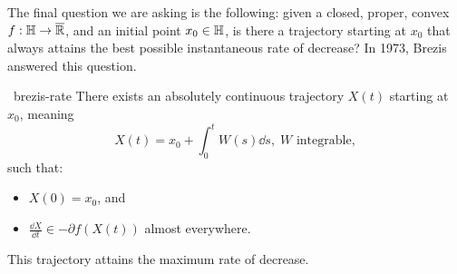 The final question we are asking is the following: given a closed, proper,
convex $f: \mathbb{H} \to \overline{\mathbb{R}}$, and an initial point $x_0 \in \mathbb{H}$, is
there a trajectory starting at $x_0$ that always attains the best possible
instantaneous rate of decrease? In 1973, Brezis answered this question.

\begin{ctheorem}{~}{brezis-rate}
	There exists an absolutely continuous trajectory $X(t)$ starting at $x_0$,
	meaning
	\[
		X(t) = x_0 + \int_0^t W(s) \dd s, \; W \text{ integrable},
	\]
	such that:
	\begin{itemize}
		\item $X(0) = x_0$, and
		\item $ \frac{\dd X}{\dd t} \in -\partial f(X(t)) $ almost everywhere.
	\end{itemize}
	This trajectory attains the maximum rate of decrease.
\end{ctheorem}
